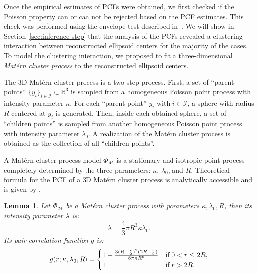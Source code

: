 \documentclass[journal]{IEEEtran}
\newtheorem{lemm}{Lemma}[section]%
\begin{document}
Once the empirical estimates of PCFs were obtained, we first checked
if the Poisson property can or can not be rejected based on the PCF
estimates. This check was performed using the envelope test described
in~\cite{baddeley2014tests}. We will show in
Section~\ref{sec:inference-step} that the analysis of the PCFs
revealed a clustering interaction between reconstructed ellipsoid
centers for the majority of the cases. To model the clustering
interaction, we proposed to fit a three-dimensional \textit{Mat\'ern
  cluster process} \cite{baddeley2007spatial} to the reconstructed
ellipsoid centers.

The 3D Mat\'ern cluster process is a two-step process. First, a set of
``parent points'' $\{ y_i \}_{i \in \mathcal{I}} \subset \mathbb{R}^3$
is sampled from a homogeneous Poisson point process with intensity
parameter $\kappa$. For each ``parent point'' $y_i$ with
$i \in \mathcal{I}$, a sphere with radius $R$ centered at $y_i$ is
generated. Then, inside each obtained sphere, a set of ``children
points'' is sampled from another homogeneous Poisson point process
with intensity parameter $\lambda_0$. A realization of the Mat\'ern
cluster process is obtained as the collection of all ``children
points''.

A Mat\'ern cluster process model $\Phi_\mathcal{M}$ is a stationary
and isotropic point process completely determined by the three
parameters: $\kappa$, $\lambda_0$, and $R$. Theoretical formula for
the PCF of a 3D Mat\'ern cluster process is analytically accessible
and is given by \cite[p.376]{illian2008statistical}.

\begin{lemm}
  Let $\Phi_{\mathcal{M}}$ be a Mat\'ern cluster process with
  parameters $\kappa, \lambda_0, R$, then its intensity parameter
  $\lambda$ is:
  \begin{equation}
    \label{eq:matern-inten}
    \lambda = \frac{4}{3}\pi R^3\kappa \lambda_0.
  \end{equation}
  Its pair correlation function $g$ is:
  \begin{equation}
    \label{eq:matern-pcf}
    g(r; \kappa, \lambda_0, R) =
    \begin{cases}
      1 + \frac{3(R - \frac{r}{2})^2 (2R + \frac{r}{2})} {8\pi \kappa
        R^6}
      & \textnormal{if } 0 < r \leq 2R, \\
      1 & \textnormal{if } r > 2R. \\
    \end{cases}
  \end{equation}
\end{lemm}
\end{document}
